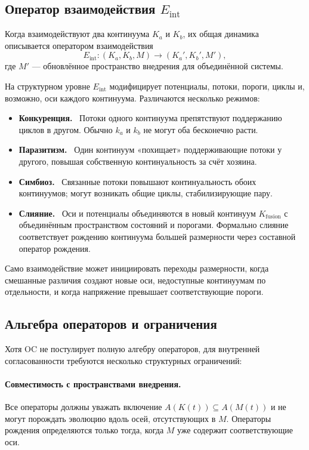 {\subsection{Оператор взаимодействия \texorpdfstring{$E_{\mathrm{int}}$}{E\_int}}

Когда взаимодействуют два континуума \(K_a\) и \(K_b\), их общая динамика
описывается оператором взаимодействия
\[
  E_{\mathrm{int}} : (K_a, K_b, M)
    \longrightarrow (K_a', K_b', M'),
\]
где \(M'\) — обновлённое пространство внедрения для объединённой системы.

На структурном уровне \(E_{\mathrm{int}}\) модифицирует потенциалы, потоки,
пороги, циклы и, возможно, оси каждого континуума. Различаются несколько
режимов:

\begin{itemize}
  \item \textbf{Конкуренция.} \
        Потоки одного континуума препятствуют поддержанию циклов в другом.
        Обычно \(k_a\) и \(k_b\) не могут оба бесконечно расти.
  \item \textbf{Паразитизм.} \
        Один континуум «похищает» поддерживающие потоки у другого, повышая
        собственную континуальность за счёт хозяина.
  \item \textbf{Симбиоз.} \
        Связанные потоки повышают континуальность обоих континуумов; могут
        возникать общие циклы, стабилизирующие пару.
  \item \textbf{Слияние.} \
        Оси и потенциалы объединяются в новый континуум
        \(K_{\mathrm{fusion}}\) с объединённым пространством состояний и
        порогами. Формально слияние соответствует рождению континуума
        большей размерности через составной оператор рождения.
\end{itemize}

Само взаимодействие может инициировать переходы размерности, когда смешанные
различия создают новые оси, недоступные континуумам по отдельности, и когда
напряжение превышает соответствующие пороги.

\subsection{Альгебра операторов и ограничения}

Хотя OC не постулирует полную алгебру операторов, для внутренней
согласованности требуются несколько структурных ограничений:

\paragraph{Совместимость с пространствами внедрения.}
Все операторы должны уважать включение
\(A(K(t)) \subseteq A(M(t))\) и не могут порождать эволюцию вдоль осей,
отсутствующих в \(M\). Операторы рождения определяются только тогда, когда
\(M\) уже содержит соответствующие оси.

}
